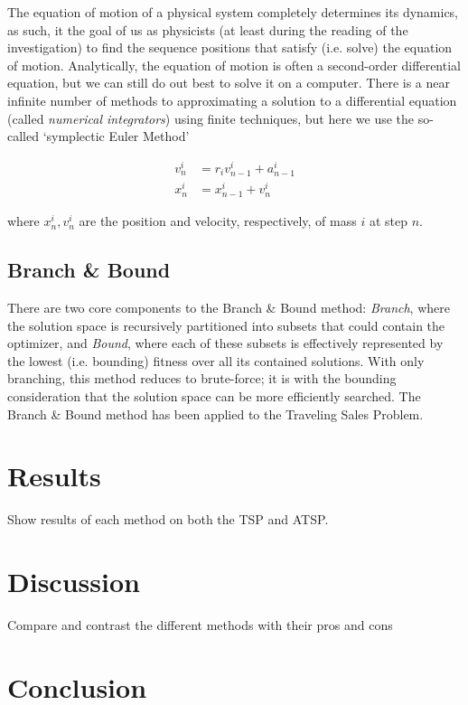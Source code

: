 \documentclass{article}
\begin{document}
            The equation of motion of a physical system completely determines its dynamics, as such, it the goal of us as physicists (at least during the reading of the investigation) to find the sequence positions that satisfy (i.e. solve) the equation of motion.  Analytically, the equation of motion is often a second-order differential equation, but we can still do out best to solve it on a computer.  There is a near infinite number of methods to approximating a solution to a differential equation (called \emph{numerical integrators}) using finite techniques, but here we use the so-called `symplectic Euler Method'

            \begin{align}
                v_n^i &= r_i v_{n-1}^i + a_{n - 1}^i \\
                x_n^i &= x_{n - 1}^i + v_n^i
            \end{align}

            where $x_n^i, v_n^i$ are the position and velocity, respectively, of mass $i$ at step $n$.

        \subsection*{Branch \& Bound}

            There are two core components to the Branch \& Bound method: \emph{Branch}, where the solution space is recursively partitioned into subsets that could contain the optimizer, and \emph{Bound}, where each of these subsets is effectively represented by the lowest (i.e. bounding) fitness over all its contained solutions.  With only branching, this method reduces to brute-force;  it is with the bounding consideration that the solution space can be more efficiently searched.  The Branch \& Bound method has been applied to the Traveling Sales Problem\cite{branch_bound}.

    \section*{Results}

        Show results of each method on both the TSP and ATSP.

    \section*{Discussion}

        Compare and contrast the different methods with their pros and cons

    \section*{Conclusion}

    \printbibliography
\end{document}
